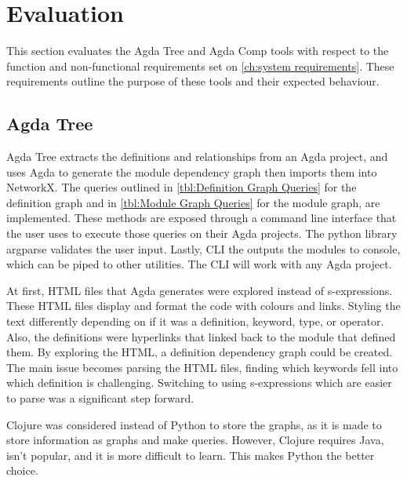 
\chapter{Evaluation}

This section evaluates the Agda Tree and Agda Comp tools with respect to the
function and non-functional requirements set on \cref{ch:system requirements}. These requirements outline the purpose of these tools and their
expected behaviour.

\section{Agda Tree} \label{sec:eval agda tree}

Agda Tree extracts the definitions and relationships from an Agda project, and
uses Agda to generate the module dependency graph then imports them into
NetworkX. The queries outlined in \cref{tbl:Definition Graph Queries} for the
definition graph and in \cref{tbl:Module Graph Queries} for the module graph,
are implemented. These methods are exposed through a command line interface
that the user uses to execute those queries on their Agda projects. The python
library argparse validates the user input. Lastly, CLI the outputs the modules to
console, which can be piped to other utilities. The CLI will work
with any Agda project.

At first, HTML files that Agda generates were explored instead of
s-expressions. These HTML files display and format the code with colours and
links. Styling the text differently depending on if it was a definition,
keyword, type, or operator. Also, the definitions were hyperlinks that linked
back to the module that defined them. By exploring the HTML, a definition
dependency graph could be created. The main issue becomes parsing the HTML
files, finding which keywords fell into which definition is challenging.
Switching to using s-expressions which are easier to parse was a significant
step forward.

Clojure was considered instead of Python to store the graphs, as it is made to
store information as graphs and make queries. However, Clojure requires Java,
isn't popular, and it is more difficult to learn. This makes Python the better
choice.


